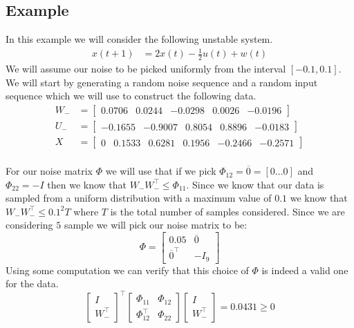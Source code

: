 \subsection{Example}
In this example we will consider the following unstable system.
\begin{align*}
	x(t+1) &= 2x(t) - \frac{1}{2}u(t) + w(t) 
\end{align*}
We will assume our noise to be picked uniformly from the interval $[-0.1 , 0.1]$. We will start by generating a random noise sequence and a random input sequence which we will use to construct the following data.
\begin{align*}
	W_- &= \begin{bmatrix}  0.0706 &  0.0244 & -0.0298 & 0.0026 & -0.0196 \end{bmatrix} \\
	U_- &= \begin{bmatrix} -0.1655 & -0.9007 &  0.8054 & 0.8896 & -0.0183 \end{bmatrix} \\
	X   &= \begin{bmatrix}     0   &  0.1533 &  0.6281 & 0.1956 & -0.2466 & -0.2571 \end{bmatrix} \\
\end{align*}

For our noise matrix $\Phi$ we will use that if we pick $\Phi_{12} = \overline{0} = [0 \dots 0]$ and $\Phi_{22} = -I$ then we know that $W_- W_-^\top \leq \Phi_{11}$. Since we know that our data is sampled from a uniform distribution with a maximum value of $0.1$ we know that $W_- W_-^\top \leq 0.1^2 T$ where $T$ is the total number of samples considered. Since we are considering $5$ sample we will pick our noise matrix to be:
\begin{equation*}
	\Phi = \begin{bmatrix} 0.05 & \overline{0} \\ \overline{0}^\top & -I_9 \end{bmatrix}
\end{equation*}
Using some computation we can verify that this choice of $\Phi$ is indeed a valid one for the data.
\begin{equation}
\begin{bmatrix} I \\ W_-^\top \end{bmatrix} ^\top
\begin{bmatrix} \Phi_{11} & \Phi_{12} \\ \Phi_{12}^\top & \Phi_{22} \end{bmatrix}
\begin{bmatrix} I \\ W_-^\top \end{bmatrix} = 0.0431 \geq 0
\end{equation}

